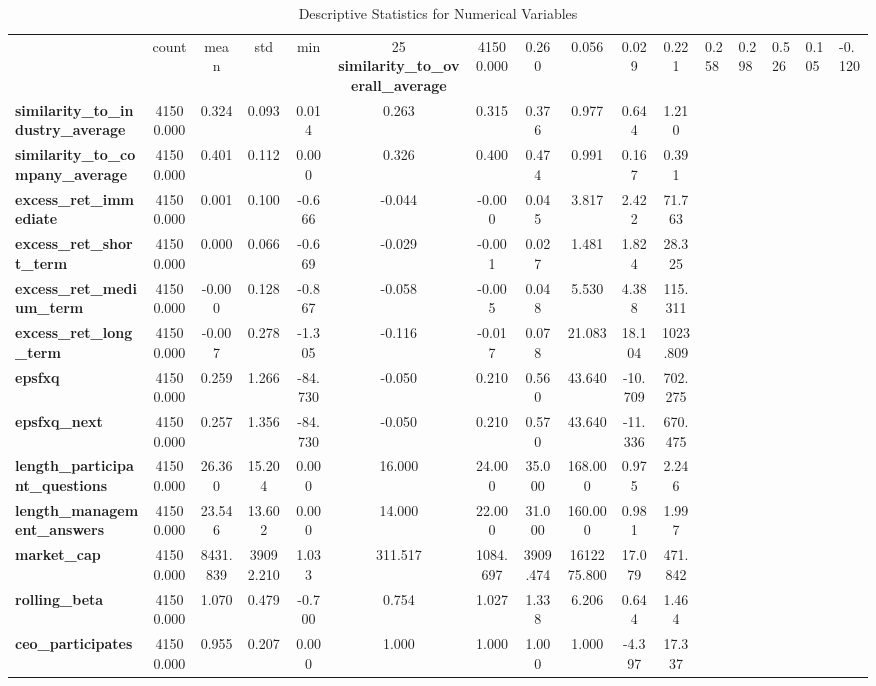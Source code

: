 \begin{table}
\caption{Descriptive Statistics for Numerical Variables}
\label{tab:descriptive_numerical}
\begin{tabular}{lcccccccccc}
\toprule
 & count & mean & std & min & 25%
\midrule
\textbf{similarity_to_overall_average} & 41500.000 & 0.260 & 0.056 & 0.029 & 0.221 & 0.258 & 0.298 & 0.526 & 0.105 & -0.120 \\
\textbf{similarity_to_industry_average} & 41500.000 & 0.324 & 0.093 & 0.014 & 0.263 & 0.315 & 0.376 & 0.977 & 0.644 & 1.210 \\
\textbf{similarity_to_company_average} & 41500.000 & 0.401 & 0.112 & 0.000 & 0.326 & 0.400 & 0.474 & 0.991 & 0.167 & 0.391 \\
\textbf{excess_ret_immediate} & 41500.000 & 0.001 & 0.100 & -0.666 & -0.044 & -0.000 & 0.045 & 3.817 & 2.422 & 71.763 \\
\textbf{excess_ret_short_term} & 41500.000 & 0.000 & 0.066 & -0.669 & -0.029 & -0.001 & 0.027 & 1.481 & 1.824 & 28.325 \\
\textbf{excess_ret_medium_term} & 41500.000 & -0.000 & 0.128 & -0.867 & -0.058 & -0.005 & 0.048 & 5.530 & 4.388 & 115.311 \\
\textbf{excess_ret_long_term} & 41500.000 & -0.007 & 0.278 & -1.305 & -0.116 & -0.017 & 0.078 & 21.083 & 18.104 & 1023.809 \\
\textbf{epsfxq} & 41500.000 & 0.259 & 1.266 & -84.730 & -0.050 & 0.210 & 0.560 & 43.640 & -10.709 & 702.275 \\
\textbf{epsfxq_next} & 41500.000 & 0.257 & 1.356 & -84.730 & -0.050 & 0.210 & 0.570 & 43.640 & -11.336 & 670.475 \\
\textbf{length_participant_questions} & 41500.000 & 26.360 & 15.204 & 0.000 & 16.000 & 24.000 & 35.000 & 168.000 & 0.975 & 2.246 \\
\textbf{length_management_answers} & 41500.000 & 23.546 & 13.602 & 0.000 & 14.000 & 22.000 & 31.000 & 160.000 & 0.981 & 1.997 \\
\textbf{market_cap} & 41500.000 & 8431.839 & 39092.210 & 1.033 & 311.517 & 1084.697 & 3909.474 & 1612275.800 & 17.079 & 471.842 \\
\textbf{rolling_beta} & 41500.000 & 1.070 & 0.479 & -0.700 & 0.754 & 1.027 & 1.338 & 6.206 & 0.644 & 1.464 \\
\textbf{ceo_participates} & 41500.000 & 0.955 & 0.207 & 0.000 & 1.000 & 1.000 & 1.000 & 1.000 & -4.397 & 17.337 \\

\end{tabular}
\end{table}
